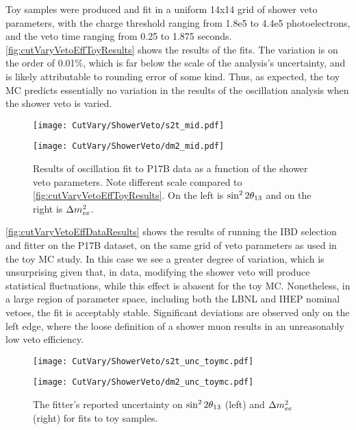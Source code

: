 \documentclass[../thesis.tex]{subfiles}
\begin{document}
Toy samples were produced and fit in a uniform 14x14 grid of shower veto parameters, with the charge threshold ranging from 1.8e5 to 4.4e5 photoelectrons, and the veto time ranging from 0.25 to 1.875 seconds. \autoref{fig:cutVaryVetoEffToyResults} shows the results of the fits. The variation is on the order of 0.01\%, which is far below the scale of the analysis's uncertainty, and is likely attributable to rounding error of some kind. Thus, as expected, the toy MC predicts essentially no variation in the results of the oscillation analysis when the shower veto is varied.

\begin{figure}[ht]
  \begin{minipage}{0.5\linewidth}%
    \texttt{[image: CutVary/ShowerVeto/s2t\_mid.pdf]}%
  \end{minipage}%
  \begin{minipage}{0.5\linewidth}%
    \texttt{[image: CutVary/ShowerVeto/dm2\_mid.pdf]}%
  \end{minipage}%
  \caption{Results of oscillation fit to P17B data as a function of the shower veto parameters. Note different scale compared to \autoref{fig:cutVaryVetoEffToyResults}. On the left is $\sin^2 2\theta_{13}$ and on the right is $\Delta m^2_{ee}$.}
  \label{fig:cutVaryVetoEffDataResults}
\end{figure}

\autoref{fig:cutVaryVetoEffDataResults} shows the results of running the IBD selection and fitter on the P17B dataset, on the same grid of veto parameters as used in the toy MC study. In this case we see a greater degree of variation, which is unsurprising given that, in data, modifying the shower veto will produce statistical fluctuations, while this effect is abasent for the toy MC. Nonetheless, in a large region of parameter space, including both the LBNL and IHEP nominal vetoes, the fit is acceptably stable. Significant deviations are observed only on the left edge, where the loose definition of a shower muon results in an unreasonably low veto efficiency.

\begin{figure}[ht]
  \begin{minipage}{0.5\linewidth}%
    \texttt{[image: CutVary/ShowerVeto/s2t\_unc\_toymc.pdf]}%
  \end{minipage}%
  \begin{minipage}{0.5\linewidth}%
    \texttt{[image: CutVary/ShowerVeto/dm2\_unc\_toymc.pdf]}%
  \end{minipage}%
  \caption{The fitter's reported uncertainty on $\sin^2 2\theta_{13}$ (left) and $\Delta m^2_{ee}$ (right) for fits to toy samples.}
  \label{fig:cutVaryVetoEffToyUnc}
\end{figure}
\end{document}
